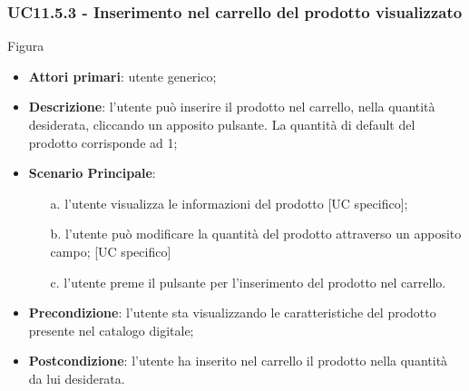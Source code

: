 \subsubsection{UC11.5.3 - Inserimento nel carrello del prodotto visualizzato}
Figura \\
\begin{itemize}
\item \textbf{Attori primari}: utente generico;
\item \textbf{Descrizione}: l'utente può inserire il prodotto nel carrello, nella quantità desiderata, cliccando un apposito pulsante. La quantità di default del prodotto corrisponde ad 1;
\item \textbf{Scenario Principale}:
\begin{enumerate}
\item[a.] l'utente visualizza le informazioni del prodotto [UC specifico];
\item[b.] l'utente può modificare la quantità del prodotto attraverso un apposito campo; [UC specifico]
\item[c.] l'utente preme il pulsante per l'inserimento del prodotto nel carrello.
\end{enumerate}
\item \textbf{Precondizione}: l'utente sta visualizzando le caratteristiche del prodotto presente nel catalogo digitale;
\item \textbf{Postcondizione}: l'utente ha inserito nel carrello il prodotto nella quantità da lui desiderata.
\end{itemize}

